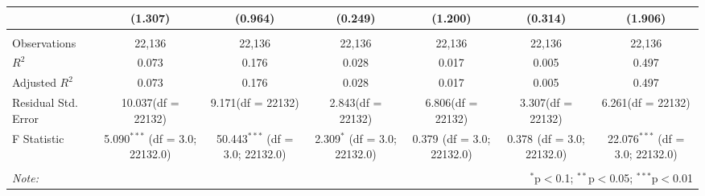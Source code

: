 \documentclass[12pt]{article}
\begin{document}
\begin{table}[!htbp]
\begin{tabular}{@{\extracolsep{5pt}}lcccccc}
  & (1.307) & (0.964) & (0.249) & (1.200) & (0.314) & (1.906) \\
\hline \\[-1.8ex]
 Observations & 22,136 & 22,136 & 22,136 & 22,136 & 22,136 & 22,136 \\
 $R^2$ & 0.073 & 0.176 & 0.028 & 0.017 & 0.005 & 0.497 \\
 Adjusted $R^2$ & 0.073 & 0.176 & 0.028 & 0.017 & 0.005 & 0.497 \\
 Residual Std. Error & 10.037(df = 22132) & 9.171(df = 22132) & 2.843(df = 22132) & 6.806(df = 22132) & 3.307(df = 22132) & 6.261(df = 22132)  \\
 F Statistic & 5.090$^{***}$ (df = 3.0; 22132.0) & 50.443$^{***}$ (df = 3.0; 22132.0) & 2.309$^{*}$ (df = 3.0; 22132.0) & 0.379$^{}$ (df = 3.0; 22132.0) & 0.378$^{}$ (df = 3.0; 22132.0) & 22.076$^{***}$ (df = 3.0; 22132.0) \\
\hline
\hline \\[-1.8ex]
\textit{Note:} & \multicolumn{6}{r}{$^{*}$p$<$0.1; $^{**}$p$<$0.05; $^{***}$p$<$0.01} \\
\end{tabular}
\end{table}
\end{document}
